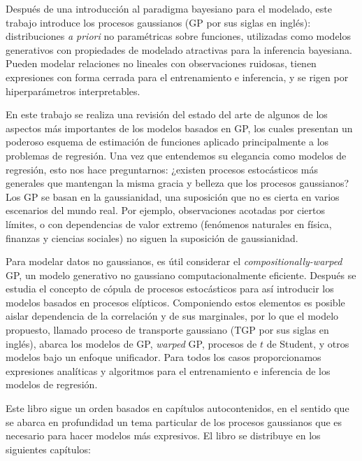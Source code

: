 Después de una introducción al paradigma bayesiano para el modelado, este trabajo introduce los procesos gaussianos (GP por sus siglas en inglés): distribuciones \emph{a priori} no paramétricas sobre funciones, utilizadas como modelos generativos con propiedades de modelado atractivas para la inferencia bayesiana. Pueden modelar relaciones no lineales con observaciones ruidosas, tienen expresiones con forma cerrada para el entrenamiento e inferencia, y se rigen por hiperparámetros interpretables.

En este trabajo se realiza una revisión del estado del arte de algunos de los aspectos más importantes de los modelos basados en GP, los cuales presentan un poderoso esquema de estimación de funciones aplicado principalmente a los problemas de regresión. Una vez que entendemos su elegancia como modelos de regresión, esto nos hace preguntarnos: ¿existen procesos estocásticos más generales que mantengan la misma gracia y belleza que los procesos gaussianos? Los GP se basan en la gaussianidad, una suposición que no es cierta en varios escenarios del mundo real. Por ejemplo, observaciones acotadas por ciertos límites, o con dependencias de valor extremo (fenómenos naturales en física, finanzas y ciencias sociales) no siguen la suposición de gaussianidad.

Para modelar datos no gaussianos, es útil considerar el \emph{compositionally-warped} GP, un modelo generativo no gaussiano computacionalmente eficiente. Después se estudia el concepto de cópula de procesos estocásticos para así introducir los modelos basados en procesos elípticos. Componiendo estos elementos es posible aislar dependencia de la correlación y de sus marginales, por lo que el modelo propuesto, llamado proceso de transporte gaussiano (TGP por sus siglas en inglés), abarca los modelos de GP, \emph{warped} GP, procesos de \(t\) de Student, y otros modelos bajo un enfoque unificador. Para todos los casos proporcionamos expresiones analíticas y algoritmos para el entrenamiento e inferencia de los modelos de regresión.

Este libro sigue un orden basados en capítulos autocontenidos, en el sentido que se abarca en profundidad un tema particular de los procesos gaussianos que es necesario para hacer modelos más expresivos. El libro se distribuye en los siguientes capítulos:

